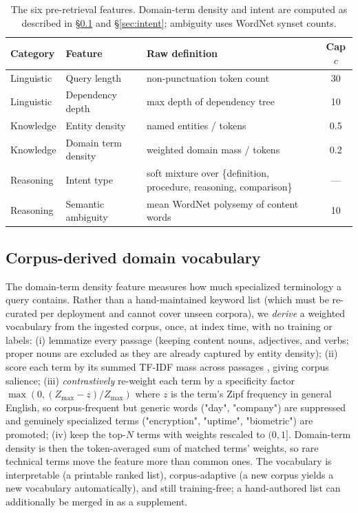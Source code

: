 \documentclass[11pt]{article}
\begin{document}
\begin{table}[t]
\centering\small
\begin{tabular}{lllc}
\toprule
Category & Feature & Raw definition & Cap $c$ \\
\midrule
Linguistic & Query length & non-punctuation token count & 30 \\
Linguistic & Dependency depth & max depth of dependency tree & 10 \\
Knowledge & Entity density & named entities / tokens & 0.5 \\
Knowledge & Domain term density & weighted domain mass / tokens & 0.2 \\
Reasoning & Intent type & soft mixture over \{definition, procedure, reasoning, comparison\} & --- \\
Reasoning & Semantic ambiguity & mean WordNet polysemy of content words & 10 \\
\bottomrule
\end{tabular}
\caption{The six pre-retrieval features. Domain-term density and intent are
computed as described in \S\ref{sec:domain} and \S\ref{sec:intent};
ambiguity uses WordNet \citep{miller1995wordnet} synset counts.}
\label{tab:features}
\end{table}

\subsection{Corpus-derived domain vocabulary}
\label{sec:domain}

The domain-term density feature measures how much specialized terminology a
query contains. Rather than a hand-maintained keyword list (which must be
re-curated per deployment and cannot cover unseen corpora), we \emph{derive} a
weighted vocabulary from the ingested corpus, once, at index time, with no
training or labels:
(i) lemmatize every passage (keeping content nouns, adjectives, and verbs;
proper nouns are excluded as they are already captured by entity density);
(ii) score each term by its summed TF-IDF mass across passages
\citep{robertson2009bm25}, giving corpus salience;
(iii) \emph{contrastively} re-weight each term by a specificity factor
$\max(0, (Z_{\max}-z)/Z_{\max})$ where $z$ is the term's Zipf frequency in
general English, so corpus-frequent but generic words ("day", "company")
are suppressed and genuinely specialized terms ("encryption", "uptime",
"biometric") are promoted; (iv) keep the top-$N$ terms with weights rescaled to
$(0,1]$. Domain-term density is then the token-averaged sum of matched terms'
weights, so rare technical terms move the feature more than common ones. The
vocabulary is interpretable (a printable ranked list), corpus-adaptive (a new
corpus yields a new vocabulary automatically), and still training-free; a
hand-authored list can additionally be merged in as a supplement.
\end{document}
